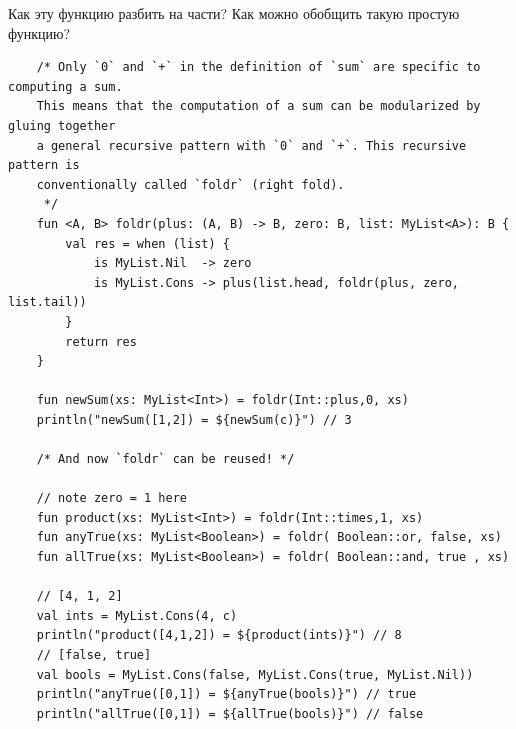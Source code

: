 \documentclass{book}
\begin{document}
Как эту функцию разбить на части? Как можно обобщить такую простую функцию?
\begin{verbatim}
    /* Only `0` and `+` in the definition of `sum` are specific to computing a sum.
    This means that the computation of a sum can be modularized by gluing together
    a general recursive pattern with `0` and `+`. This recursive pattern is
    conventionally called `foldr` (right fold).
     */
    fun <A, B> foldr(plus: (A, B) -> B, zero: B, list: MyList<A>): B {
        val res = when (list) {
            is MyList.Nil  -> zero
            is MyList.Cons -> plus(list.head, foldr(plus, zero, list.tail))
        }
        return res
    }

    fun newSum(xs: MyList<Int>) = foldr(Int::plus,0, xs)
    println("newSum([1,2]) = ${newSum(c)}") // 3

    /* And now `foldr` can be reused! */

    // note zero = 1 here
    fun product(xs: MyList<Int>) = foldr(Int::times,1, xs)
    fun anyTrue(xs: MyList<Boolean>) = foldr( Boolean::or, false, xs)
    fun allTrue(xs: MyList<Boolean>) = foldr( Boolean::and, true , xs)

    // [4, 1, 2]
    val ints = MyList.Cons(4, c)
    println("product([4,1,2]) = ${product(ints)}") // 8
    // [false, true]
    val bools = MyList.Cons(false, MyList.Cons(true, MyList.Nil))
    println("anyTrue([0,1]) = ${anyTrue(bools)}") // true
    println("allTrue([0,1]) = ${allTrue(bools)}") // false
\end{verbatim}
\end{document}
